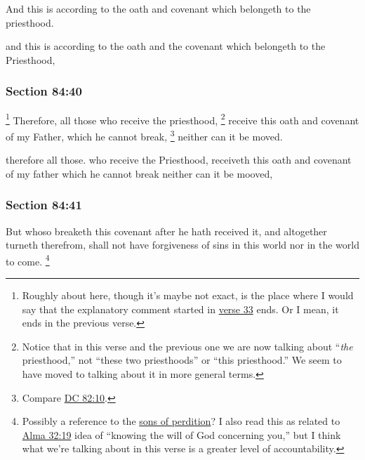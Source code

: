 		And this is according to the oath and covenant which belongeth to the priesthood.

		\begin{framed}
		\scriptsize
			\begin{compactdesc}
				\item[JSP] and this is according to the oath and the covenant which belongeth to the Priesthood,
			\end{compactdesc}
		\end{framed}

	\subsubsection{Section 84:40} %
		\label{DC84-40}

			\footnote{%
				Roughly about here, though it's maybe not exact, is the place where I would say that the explanatory comment started in \hyperref[DC84-33]{verse 33} ends. Or I mean, it ends in the previous verse.
				}%
		Therefore, all those who receive the priesthood,%
			\footnote{%
				Notice that in this verse and the previous one we are now talking about ``\textit{the} priesthood,'' not ``these two priesthoods'' or ``this priesthood.'' We seem to have moved to talking about it in more general terms.
				}
		receive this oath and covenant of my Father, which he cannot break,%
			\footnote{%
				Compare \hyperref[DC82-10]{DC 82:10}.
				} 
		neither can it be moved.

		\begin{framed}
		\scriptsize
			\begin{compactdesc}
				\item[JSP] therefore all those. who receive the Priesthood, receiveth this oath and covenant of my father which he cannot break neither can it be mooved,
			\end{compactdesc}
		\end{framed}

	\subsubsection{Section 84:41} %
		\label{DC84-41}

		But whoso breaketh this covenant after he hath received it, and altogether turneth therefrom, shall not have forgiveness of sins in this world nor in the world to come.%
			\footnote{%
				Possibly a reference to the \hyperref[SONSOFPERDITION]{sons of perdition}? I also read this as related to \hyperref[ALMA-32-19]{Alma 32:19} idea of ``knowing the will of God concerning you,'' but I think what we're talking about in this verse is a greater level of accountability.
				}

